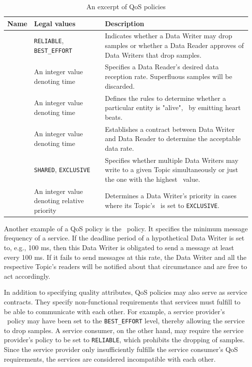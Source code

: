 %
%
%
%
%
\begin{table}[htpb]
  \caption[An excerpt of DDS QoS policies]{An excerpt of QoS policies}\label{tab:qos}
  \centering
  \begin{tabular}{p{} p{}  p{}}
    \toprule
      \textbf{Name} & \textbf{Legal values} & \textbf{Description} \\
    \midrule
    	\reliability  & \texttt{RELIABLE}, \texttt{BEST\_EFFORT} & Indicates whether a Data Writer may drop samples or whether a Data Reader approves of Data Writers that drop samples.\\
    	\tbf  & An integer value denoting time & Specifies a Data Reader's desired data reception rate. Superfluous samples will be discarded.\\
    	\liveliness  & An integer value denoting time & Defines the rules to determine whether a particular entity is "alive", \eg\ by emitting heart beats. \\
    	\deadline  & An integer value denoting time & Establishes a contract between Data Writer and Data Reader to determine the acceptable data rate. \\
    	\ownership  & \texttt{SHARED}, \texttt{EXCLUSIVE} & Specifies whether multiple Data Writers may write to a given Topic simultaneously or just the one with the highest \ostrength\  value.\\
    	\ostrength  & An integer value denoting relative priority & Determines a Data Writer's priority in cases where its Topic's \ownership\ is set to \texttt{EXCLUSIVE}. \\
    \bottomrule
  \end{tabular}
\end{table}
%
%
%
%
%

Another example of a QoS policy is the \deadline\ policy. It specifies the minimum message frequency of a service. If the deadline period of a hypothetical Data Writer is set to, e.g., 100 ms, then this Data Writer is obligated to send a message at least every 100 ms. If it fails to send messages at this rate, the Data Writer and all the respective Topic's readers will be notified about that circumstance and are free to act accordingly.

In addition to specifying quality attributes, QoS policies may also serve as service contracts. They specify non-functional requirements that services must fulfill to be able to communicate with each other. For example, a service provider's \reliability\ policy may have been set to the \texttt{BEST\_EFFORT} level, thereby allowing the service to drop samples. A service consumer, on the other hand, may require the service provider's policy to be set to \texttt{RELIABLE}, which prohibits the dropping of samples. Since the service provider only insufficiently fulfills the service consumer's QoS requirements, the services are considered incompatible with each other.

